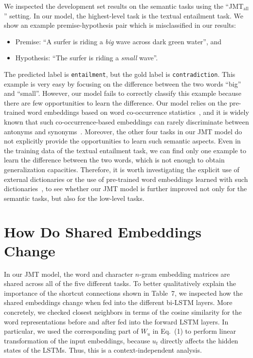 \documentclass[11pt,a4paper]{article}
\begin{document}
We inspected the development set results on the semantic tasks using the ``JMT$_{\mathrm{all}}$'' setting.
In our model, the highest-level task is the textual entailment task.
We show an example premise-hypothesis pair which is misclassified in our results:
\begin{itemize}
\item[] Premise: ``A surfer is riding a {\it big} wave across dark green water'', and
\item[] Hypothesis: ``The surfer is riding a {\it small} wave''.
\end{itemize}
The predicted label is {\tt entailment}, but the gold label is {\tt contradiction}.
This example is very easy by focusing on the difference between the two words ``big'' and ``small''.
However, our model fails to correctly classify this example because there are few opportunities to learn the difference.
Our model relies on the pre-trained word embeddings based on word co-occurrence statistics~\citep{mikolov2013word2vec}, and it is widely known that such co-occurrence-based embeddings can rarely discriminate between antonyms and synonyms~\citep{ono2015ant}.
Moreover, the other four tasks in our JMT model do not explicitly provide the opportunities to learn such semantic aspects.
Even in the training data of the textual entailment task, we can find only one example to learn the difference between the two words, which is not enough to obtain generalization capacities.
Therefore, it is worth investigating the explicit use of external dictionaries or the use of pre-trained word embeddings learned with such dictionaries~\citep{ono2015ant}, to see whether our JMT model is further improved not only for the semantic tasks, but also for the low-level tasks.


\section{How Do Shared Embeddings Change}
\label{sec:change}

In our JMT model, the word and character $n$-gram embedding matrices are shared across all of the five different tasks.
To better qualitatively explain the importance of the shortcut connections shown in Table~7, we inspected how the shared embeddings change when fed into the different bi-LSTM layers.
More concretely, we checked closest neighbors in terms of the cosine similarity for the word representations before and after fed into the forward LSTM layers.
In particular, we used the corresponding part of $W_u$ in Eq.~(1) to perform linear transformation of the input embeddings, because $u_t$ directly affects the hidden states of the LSTMs.
Thus, this is a context-independent analysis.
\end{document}
